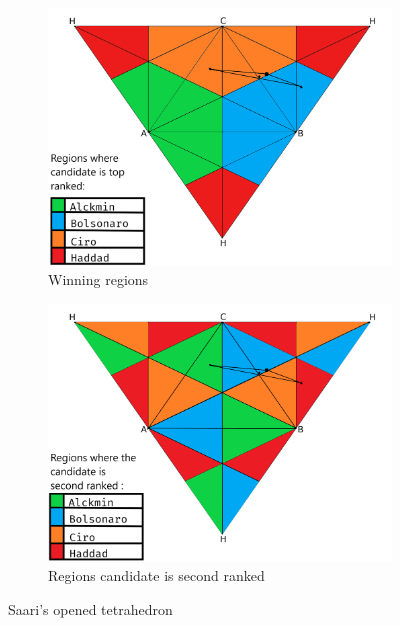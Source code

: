 \documentclass[hidelinks,11pt]{article} \usepackage[utf8]{inputenc}
\begin{document}
\begin{figure}[!h] \centering
  \begin{subfigure}[b]{0.49\textwidth} \centering
\includegraphics[width=\textwidth]{./images/opened_tetrahedron1_winning.png}
 \caption{Winning regions}
 \label{fig:ot_win}
\end{subfigure} \hfill
  \begin{subfigure}[b]{0.49\textwidth} \centering
\includegraphics[width=\textwidth]{./images/opened_tetrahedron1_second_ranked.png}
 \caption{Regions candidate is second ranked}
 \label{fig:ot_second}
\end{subfigure}
\caption{Saari's opened tetrahedron}
\label{fig:ot}
\end{figure}
\end{document}
